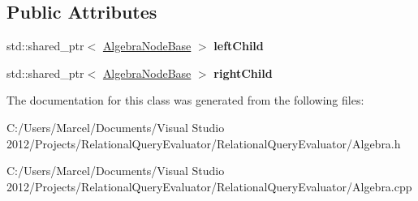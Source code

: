 \subsection*{Public Attributes}
\begin{DoxyCompactItemize}
\item 
\hypertarget{class_binary_algebra_node_base_ab62ff77c5d90bd941b07a6f34e39f14b}{std\+::shared\+\_\+ptr$<$ \hyperlink{class_algebra_node_base}{Algebra\+Node\+Base} $>$ {\bfseries left\+Child}}\label{class_binary_algebra_node_base_ab62ff77c5d90bd941b07a6f34e39f14b}

\item 
\hypertarget{class_binary_algebra_node_base_ac97784ae724c411daca8b17664ce1122}{std\+::shared\+\_\+ptr$<$ \hyperlink{class_algebra_node_base}{Algebra\+Node\+Base} $>$ {\bfseries right\+Child}}\label{class_binary_algebra_node_base_ac97784ae724c411daca8b17664ce1122}

\end{DoxyCompactItemize}


The documentation for this class was generated from the following files\+:\begin{DoxyCompactItemize}
\item 
C\+:/\+Users/\+Marcel/\+Documents/\+Visual Studio 2012/\+Projects/\+Relational\+Query\+Evaluator/\+Relational\+Query\+Evaluator/Algebra.\+h\item 
C\+:/\+Users/\+Marcel/\+Documents/\+Visual Studio 2012/\+Projects/\+Relational\+Query\+Evaluator/\+Relational\+Query\+Evaluator/Algebra.\+cpp\end{DoxyCompactItemize}
